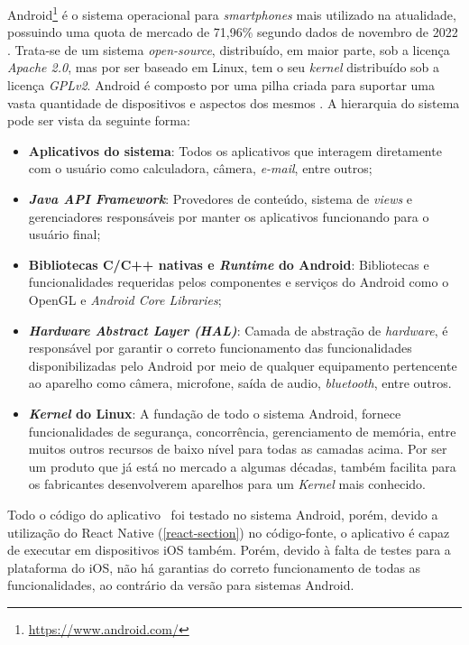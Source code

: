 Android\footnote{\url{https://www.android.com/}} é o sistema operacional para \textit{smartphones} mais utilizado na atualidade, possuindo uma quota de mercado de 71,96\% segundo dados de novembro de 2022 \cite{mobile-os}. Trata-se de um sistema \textit{open-source}, distribuído, em maior parte, sob a licença \textit{Apache 2.0}, mas por ser baseado em Linux, tem o seu \textit{kernel} distribuído sob a licença \textit{GPLv2}. Android é composto por uma pilha criada para suportar uma vasta quantidade de dispositivos e aspectos dos mesmos \cite{android}. A hierarquia do sistema pode ser vista da seguinte forma:

\begin{itemize}
    \item \textbf{Aplicativos do sistema}: Todos os aplicativos que interagem diretamente com o usuário como calculadora, câmera, \textit{e-mail}, entre outros;
    \item \textbf{\textit{Java API Framework}}: Provedores de conteúdo, sistema de \textit{views} e gerenciadores responsáveis por manter os aplicativos funcionando para o usuário final;
    \item \textbf{Bibliotecas C/C++ nativas e \textit{Runtime} do Android}: Bibliotecas e funcionalidades requeridas pelos componentes e serviços do Android como o OpenGL e \textit{Android Core Libraries};
    \item \textbf{\textit{Hardware Abstract Layer (HAL)}}: Camada de abstração de \textit{hardware}, é responsável por garantir o correto funcionamento das funcionalidades disponibilizadas pelo Android por meio de qualquer equipamento pertencente ao aparelho como câmera, microfone, saída de audio, \textit{bluetooth}, entre outros.
    \item \textbf{\textit{Kernel} do Linux}: A fundação de todo o sistema Android, fornece funcionalidades de segurança, concorrência, gerenciamento de memória, entre muitos outros recursos de baixo nível para todas as camadas acima. Por ser um produto que já está no mercado a algumas décadas, também facilita para os fabricantes desenvolverem aparelhos para um \textit{Kernel} mais conhecido.
\end{itemize}

Todo o código do aplicativo \appName\ foi testado no sistema Android, porém, devido a utilização do React Native (\ref{react-section}) no código-fonte, o aplicativo é capaz de executar em dispositivos iOS também. Porém, devido à falta de testes para a plataforma do iOS, não há garantias do correto funcionamento de todas as funcionalidades, ao contrário da versão para sistemas Android.

